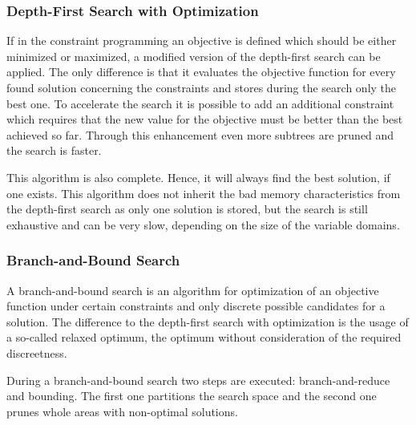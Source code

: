 \documentclass[10pt,
               a4paper,
               journal,
               ]{IEEEtran}
\begin{document}
	\subsubsection{Depth-First Search with Optimization}
	If in the constraint programming an objective is defined which should be either minimized or maximized, a modified version of the depth-first search can be applied. The only difference is that it evaluates the objective function for every found solution concerning the constraints and stores during the search only the best one. To accelerate the search it is possible to add an additional constraint which requires that the new value for the objective must be better than the best achieved so far. Through this enhancement even more subtrees are pruned and the search is faster.
	
	This algorithm is also complete. Hence, it will always find the best solution, if one exists. This algorithm does not inherit the bad memory characteristics from the depth-first search as only one solution is stored, but the search is still exhaustive and can be very slow, depending on the size of the variable domains.
	
	\subsubsection{Branch-and-Bound Search}
	A branch-and-bound search is an algorithm for optimization of an objective function under certain constraints and only discrete possible candidates for a solution. The difference to the depth-first search with optimization is the usage of a so-called relaxed optimum, the optimum without consideration of the required discreetness.
	
	During a branch-and-bound search two steps are executed: branch-and-reduce and bounding. The first one partitions the search space and the second one prunes whole areas with non-optimal solutions.
	
\end{document}
